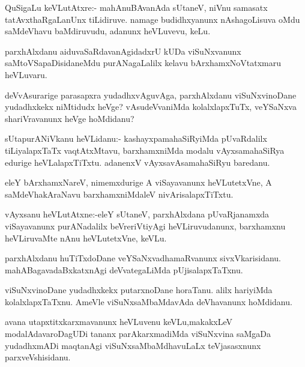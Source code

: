 \documentclass{article}
\begin{document}
 

\begin{mn}
QuSigaLu keVLutAtxre:- mahAnuBAvanAda sUtaneV, niVnu samasatx 
tatAvxthaRgaLanUnx tiLidiruve. namage budidhxyanunx nAshagoLisuva 
oMdu saMdeVhavu baMdiruvudu, adanunx heVLuvevu, keLu.
\end{mn}

\begin{mn}
parxhAlxdanu aiduvaSaRdavanAgidadxrU kUDa viSuNxvanunx 
saMtoVSapaDisidaneMdu purANagaLalilx kelavu bArxhamxNoVtatxmaru 
heVLuvaru.
\end{mn}

\begin{mn}
deVvAsurarige parasapxra yudadhxvAguvAga, parxhAlxdanu 
viSuNxvinoDane yudadhxkekx niMtidudx heVge?  vAsudeVvaniMda
kolalxlapxTuTx, veYSaNxva shariVravanunx heVge hoMdidanu? 
\end{mn}

\begin{mn}
sUtapurANiVkanu heVLidanu:- kashayxpamahaSiRyiMda pUvaRdalilx 
tiLiyalapxTaTx vaqtAtxMtavu, barxhamxniMda modalu vAyxsamahaSiRya 
edurige heVLalapxTiTxtu. adanenxV vAyxsavAsamahaSiRyu baredanu.
\end{mn}

\begin{mn}
eleY bArxhamxNareV, nimemxdurige A viSayavanunx heVLutetxVne,  
A saMdeVhakAraNavu barxhamxniMdaleV nivArisalapxTiTxtu.
\end{mn}

\begin{mn}
vAyxsanu heVLutAtxne:-eleY sUtaneV, parxhAlxdana pUvaRjanamxda 
viSayavanunx purANadalilx beVreriVtiyAgi heVLiruvudanunx,
barxhamxnu heVLiruvaMte nAnu heVLutetxVne, keVLu.
\end{mn}

\begin{mn}
parxhAlxdanu huTiTxdoDane veYSaNxvadhamaRvanunx sivxVkarisidanu. 
mahABagavadaBxkatxnAgi deVvategaLiMda pUjisalapxTaTxnu.
\end{mn}

\begin{mn}
viSuNxvinoDane yudadhxkekx putarxnoDane horaTanu. alilx 
hariyiMda kolalxlapxTaTxnu. AmeVle viSuNxsaMbaMdavAda 
deVhavanunx hoMdidanu.
\end{mn}

\begin{mn}
avana utapxtitxkarxmavanunx heVLuvenu keVLu,makakxLeV modalAdavaroDagUDi
tananx parAkarxmadiMda viSuNxvina saMgaDa yudadhxmADi maqtanAgi
viSuNxsaMbaMdhavuLaLx teVjasasxnunx parxveVshisidanu.
\end{mn}
\end{document}
